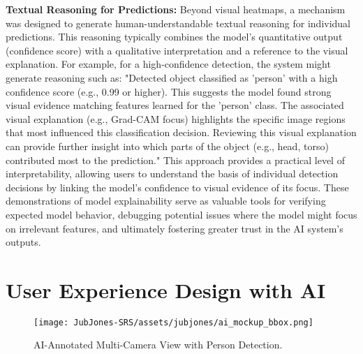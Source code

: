 \textbf{Textual Reasoning for Predictions:}
Beyond visual heatmaps, a mechanism was designed to generate human-understandable textual reasoning for individual predictions. This reasoning typically combines the model's quantitative output (confidence score) with a qualitative interpretation and a reference to the visual explanation. For example, for a high-confidence detection, the system might generate reasoning such as:
"Detected object classified as 'person' with a high confidence score (e.g., 0.99 or higher). This suggests the model found strong visual evidence matching features learned for the 'person' class. The associated visual explanation (e.g., Grad-CAM focus) highlights the specific image regions that most influenced this classification decision. Reviewing this visual explanation can provide further insight into which parts of the object (e.g., head, torso) contributed most to the prediction."
This approach provides a practical level of interpretability, allowing users to understand the basis of individual detection decisions by linking the model's confidence to visual evidence of its focus.
These demonstrations of model explainability serve as valuable tools for verifying expected model behavior, debugging potential issues where the model might focus on irrelevant features, and ultimately fostering greater trust in the AI system's outputs.

\section{User Experience Design with AI}
\label{section:ux_design} %

\begin{figure}[H]
    \centering
    \texttt{[image: JubJones-SRS/assets/jubjones/ai\_mockup\_bbox.png]}
    \caption{AI-Annotated Multi-Camera View with Person Detection.}
    \label{fig:ai_mockup_bbox}
\end{figure}

